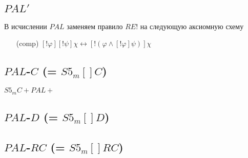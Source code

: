 \documentclass[11pt]{article}
\begin{document}
\subsection{$PAL'$}
В исчислении $PAL$ заменяем правило $RE!$ на следующую аксиомную схему
\begin{itemize}
\item[(comp)] $[!\varphi][!\psi]\chi \leftrightarrow [! (\varphi \wedge [!\varphi] \psi)]\chi$
\end{itemize}

\subsection{$PAL$-$C$ (= $S5_m[]C$)}
$S5_mC + PAL + $
\subsection{$PAL$-$D$ (= $S5_m[]D$)}

\subsection{$PAL$-$RC$ (= $S5_m[]RC$)}
\end{document}
